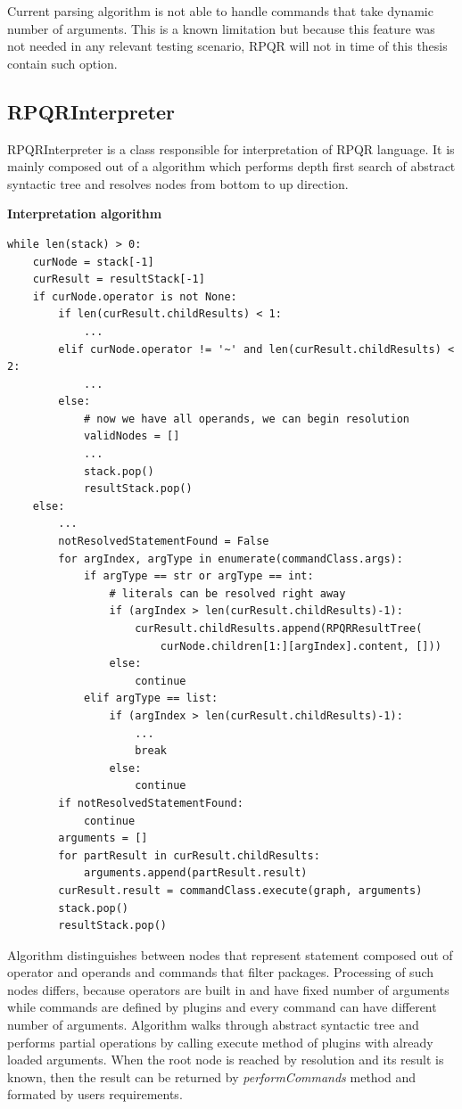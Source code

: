 Current parsing algorithm is not able to handle commands that take dynamic number of arguments. This
is a known limitation but because this feature was not needed in any relevant testing scenario,
RPQR will not in time of this thesis contain such option.

\newpage

\subsection*{RPQRInterpreter}

RPQRInterpreter is a class responsible for interpretation of RPQR language. It is mainly composed out
of a algorithm which performs depth first search of abstract syntactic tree and resolves nodes from
bottom to up direction.

\textbf{Interpretation algorithm}

\begin{lstlisting}
while len(stack) > 0:
    curNode = stack[-1]
    curResult = resultStack[-1]
    if curNode.operator is not None:
        if len(curResult.childResults) < 1:
            ...
        elif curNode.operator != '~' and len(curResult.childResults) < 2:
            ...
        else:
            # now we have all operands, we can begin resolution
            validNodes = []
            ...
            stack.pop()
            resultStack.pop()
    else:
        ...
        notResolvedStatementFound = False
        for argIndex, argType in enumerate(commandClass.args):
            if argType == str or argType == int:
                # literals can be resolved right away
                if (argIndex > len(curResult.childResults)-1):
                    curResult.childResults.append(RPQRResultTree(
                        curNode.children[1:][argIndex].content, []))
                else:
                    continue
            elif argType == list:
                if (argIndex > len(curResult.childResults)-1):
                    ...
                    break
                else:
                    continue
        if notResolvedStatementFound:
            continue
        arguments = []
        for partResult in curResult.childResults:
            arguments.append(partResult.result)
        curResult.result = commandClass.execute(graph, arguments)
        stack.pop()
        resultStack.pop()
\end{lstlisting}

Algorithm distinguishes between nodes that represent statement composed out of operator and operands
and commands that filter packages. Processing of such nodes differs, because operators are built in
and have fixed number of arguments while commands are defined by plugins and every command can have
different number of arguments. Algorithm walks through abstract syntactic tree and performs partial
operations by calling execute method of plugins with already loaded arguments. When the root node
is reached by resolution and its result is known, then the result can be returned by \textit{performCommands}
method and formated by users requirements.

